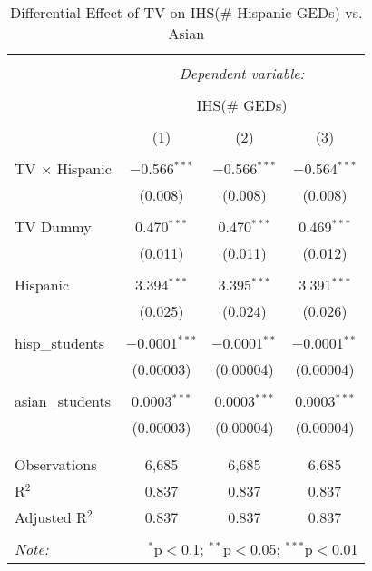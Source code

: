 
\begin{table}[!htbp] \centering 
  \caption{Differential Effect of TV on IHS(\# Hispanic GEDs) vs. Asian} 
  \label{} 
\begin{tabular}{@{\extracolsep{-2pt}}lccc} 
\\[-1.8ex]\hline 
\hline \\[-1.8ex] 
 & \multicolumn{3}{c}{\textit{Dependent variable:}} \\ 
\cline{2-4} 
\\[-1.8ex] & \multicolumn{3}{c}{IHS(\# GEDs)} \\ 
\\[-1.8ex] & (1) & (2) & (3)\\ 
\hline \\[-1.8ex] 
 TV $\times$ Hispanic & $-$0.566$^{***}$ & $-$0.566$^{***}$ & $-$0.564$^{***}$ \\ 
  & (0.008) & (0.008) & (0.008) \\ 
  & & & \\ 
 TV Dummy & 0.470$^{***}$ & 0.470$^{***}$ & 0.469$^{***}$ \\ 
  & (0.011) & (0.011) & (0.012) \\ 
  & & & \\ 
 Hispanic & 3.394$^{***}$ & 3.395$^{***}$ & 3.391$^{***}$ \\ 
  & (0.025) & (0.024) & (0.026) \\ 
  & & & \\ 
 hisp\_students & $-$0.0001$^{***}$ & $-$0.0001$^{**}$ & $-$0.0001$^{**}$ \\ 
  & (0.00003) & (0.00004) & (0.00004) \\ 
  & & & \\ 
 asian\_students & 0.0003$^{***}$ & 0.0003$^{***}$ & 0.0003$^{***}$ \\ 
  & (0.00003) & (0.00004) & (0.00004) \\ 
  & & & \\ 
\hline \\[-1.8ex] 
Observations & 6,685 & 6,685 & 6,685 \\ 
R$^{2}$ & 0.837 & 0.837 & 0.837 \\ 
Adjusted R$^{2}$ & 0.837 & 0.837 & 0.837 \\ 
\hline 
\hline \\[-1.8ex] 
\textit{Note:}  & \multicolumn{3}{r}{$^{*}$p$<$0.1; $^{**}$p$<$0.05; $^{***}$p$<$0.01} \\ 
\end{tabular} 
\end{table} 
